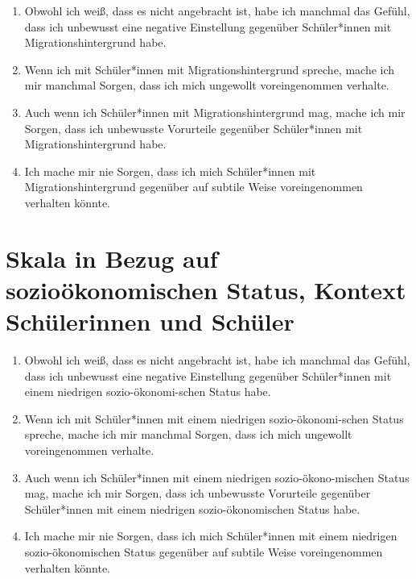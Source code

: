 \begin{enumerate}
	\item Obwohl ich weiß, dass es nicht angebracht ist, habe ich manchmal das Gefühl, dass ich unbewusst eine negative Einstellung gegenüber Schüler*innen mit Migrationshintergrund habe.
	
	\item Wenn ich mit Schüler*innen mit Migrationshintergrund spreche, mache ich mir manchmal Sorgen, dass ich mich ungewollt voreingenommen verhalte.
	
	\item Auch wenn ich Schüler*innen mit Migrationshintergrund mag, mache ich mir Sorgen, dass ich unbewusste Vorurteile gegenüber Schüler*innen mit Migrationshintergrund habe.
	
	\item Ich mache mir nie Sorgen, dass ich mich Schüler*innen mit Migrationshintergrund gegenüber auf subtile Weise voreingenommen verhalten könnte.
\end{enumerate}


\section*{Skala in Bezug auf sozioökonomischen Status, Kontext Schülerinnen und Schüler}
\label{app:skala-sozoek-sus}

\begin{enumerate}
	\item Obwohl ich weiß, dass es nicht angebracht ist, habe ich manchmal das Gefühl, dass ich unbewusst eine negative Einstellung gegenüber Schüler*innen mit einem niedrigen sozio-ökonomi-\break schen Status habe.
	
	\item Wenn ich mit Schüler*innen mit einem niedrigen sozio-ökonomi-\break schen Status spreche, mache ich mir manchmal Sorgen, dass ich mich ungewollt voreingenommen verhalte.
	
	\item Auch wenn ich Schüler*innen mit einem niedrigen sozio-ökono-\-mischen Status mag, mache ich mir Sorgen, dass ich unbewusste Vorurteile gegenüber Schüler*innen mit einem niedrigen sozio-ökonomischen Status habe.
	
	\item Ich mache mir nie Sorgen, dass ich mich Schüler*innen mit einem niedrigen sozio-ökonomischen Status gegenüber auf subtile Weise voreingenommen verhalten könnte.
\end{enumerate}


